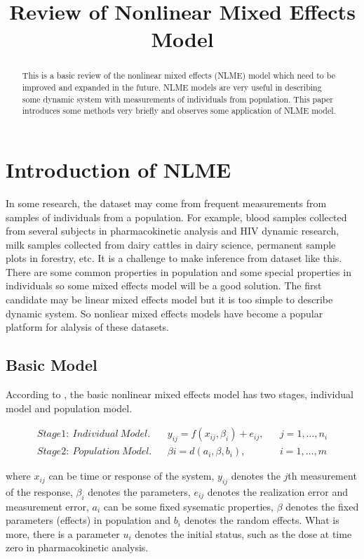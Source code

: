 \documentclass[12pt]{extarticle}
\title{Review of Nonlinear Mixed Effects Model}
\begin{document}
\maketitle
\begin{abstract}
This is a basic review of the nonlinear mixed effects (NLME) model which need to be improved and expanded in the future. NLME models are very useful in describing some dynamic system with measurements of individuals from population. This paper introduces some methods very briefly and observes some application of NLME model.
\end{abstract}
\section{Introduction of NLME}
\label{sect:Introduction}
In some research, the dataset may come from frequent measurements from samples of individuals from a population. For example, blood samples collected from several subjects in pharmacokinetic analysis and HIV dynamic research, milk samples collected from dairy cattles in dairy science, permanent sample plots in forestry, etc. It is a challenge to make inference from dataset like this. There are some common properties in population and some special properties in individuals so some mixed effects model will be a good solution. The first candidate may be linear mixed effects model but it is too simple to describe dynamic system. So nonliear mixed effects models have become a popular platform for alalysis of these datasets.

\subsection{Basic Model}
\label{sect:basic}
According to \cite{Davidian03}, the basic nonlinear mixed effects model has two stages, individual model and population model.

\begin{align}
Stage 1: \ Individual\  Model. & & y_{ij} = f(x_{ij},\beta_{i})+e_{ij}, & & j=1,\ldots,n_{i} \label{im1} \\
Stage 2: \ Population\  Model.  & & \beta{i} = d(a_{i},\beta,b_{i}), & & i=1,\ldots,m \label{pm1} 
\end{align}

where $x_{ij}$ can be time or response of the system, $y_{ij}$ denotes the $j$th measurement of the response, $\beta_{i}$ denotes the parameters, $e_{ij}$ denotes the realization error and measurement error, $a_{i}$ can be some fixed sysematic properties, $\beta$ denotes the fixed parameters (effects) in population and $b_{i}$ denotes the random effects. What is more, there is a parameter $u_i$ denotes the initial status, such as the dose at time zero in pharmacokinetic analysis.
\end{document}
